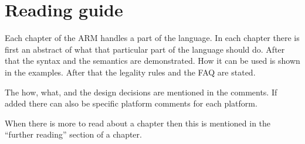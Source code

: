 \chapter*{Reading guide}
Each chapter of the ARM handles a part of the \Compose* language. In each chapter there
is first an abstract of what that particular part of the language should do. After that
the syntax and the semantics are demonstrated. How it can be used is shown in the examples.
After that the legality rules and the FAQ are stated.

The how, what, and the design decisions are mentioned in the comments. If added there can also be specific platform comments for each \Compose* platform.

When there is more to read about a chapter then this is mentioned in the ``further reading'' section of a chapter.